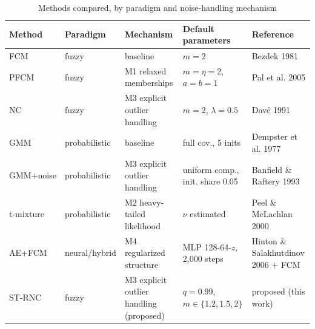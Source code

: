\begin{table}[t]
\centering
\scriptsize
\setlength{\tabcolsep}{3pt}
\caption{Methods compared, by paradigm and noise-handling mechanism}
\label{tab:methods}
\begin{tabular}{lllll}
\toprule
Method & Paradigm & Mechanism & Default parameters & Reference \\
\midrule
FCM & fuzzy & baseline & $m=2$ & Bezdek 1981 \\
PFCM & fuzzy & M1 relaxed memberships & $m=\eta=2$, $a=b=1$ & Pal et al. 2005 \\
NC & fuzzy & M3 explicit outlier handling & $m=2$, $\lambda=0.5$ & Dav\'e 1991 \\
GMM & probabilistic & baseline & full cov., 5 inits & Dempster et al. 1977 \\
GMM+noise & probabilistic & M3 explicit outlier handling & uniform comp., init. share 0.05 & Banfield \& Raftery 1993 \\
t-mixture & probabilistic & M2 heavy-tailed likelihood & $\nu$ estimated & Peel \& McLachlan 2000 \\
AE+FCM & neural/hybrid & M4 regularized structure & MLP 128-64-$z$, 2,000 steps & Hinton \& Salakhutdinov 2006 + FCM \\
ST-RNC & fuzzy & M3 explicit outlier handling (proposed) & $q=0.99$, $m\in\{1.2,1.5,2\}$ & proposed (this work) \\
\bottomrule
\end{tabular}
\end{table}
